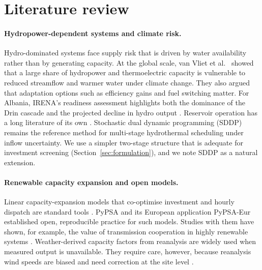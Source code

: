 \section{Literature review}
\label{sec:lit}

\paragraph{Hydropower-dependent systems and climate risk.}
Hydro-dominated systems face supply risk that is driven by water availability rather than by generating
capacity. At the global scale, van Vliet et al.\ \cite{vanvliet2016vulnerability} showed that a large share of
hydropower and thermoelectric capacity is vulnerable to reduced streamflow and warmer water under climate change.
They also argued that adaptation options such as efficiency gains and fuel switching matter. For Albania,
IRENA's readiness assessment highlights both the dominance of the Drin cascade and the projected decline in
hydro output \cite{irena2021rra}. Reservoir operation has a long literature of its own
\cite{labadie2004reservoir}. Stochastic dual dynamic programming (SDDP) \cite{pereira1991sddp} remains the
reference method for multi-stage hydrothermal scheduling under inflow uncertainty. We use a simpler two-stage
structure that is adequate for investment screening (Section~\ref{sec:formulation}), and we note SDDP as a
natural extension.

\paragraph{Renewable capacity expansion and open models.}
Linear capacity-expansion models that co-optimise investment and hourly dispatch are standard tools
\cite{pfenninger2014modeling}. PyPSA \cite{brown2018pypsa} and its European application PyPSA-Eur
\cite{horsch2018pypsaeur} established open, reproducible practice for such models. Studies with them have
shown, for example, the value of transmission cooperation in highly renewable systems
\cite{schlachtberger2017cooperation}. Weather-derived capacity factors from reanalysis are widely used when
measured output is unavailable. They require care, however, because reanalysis wind speeds are biased and
need correction at the site level \cite{staffell2016wind,pfenninger2016pv,gelaro2017merra2,hersbach2020era5}.

